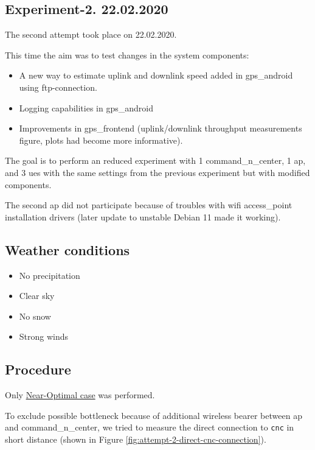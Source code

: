 \subsection{Experiment-2. 22.02.2020}\label{experiment-1.-22.02.2020}

The second attempt took place on 22.02.2020.

This time the aim was to test changes in the system components:

\begin{itemize}
\tightlist
\item
  A new way to estimate uplink and downlink speed added in \gls{gps_android} using \gls{ftp}-connection.
\item
  Logging capabilities in \gls{gps_android}
\item
  Improvements in \gls{gps_frontend} (uplink/downlink throughput measurements figure, plots had become more informative).
\end{itemize}



The goal is to perform an reduced experiment with 1 \gls{command_n_center}, 1 \gls{ap}, and 3 \glspl{ue} with the same settings from the previous experiment but with modified components.

The second \gls{ap} did not participate because of troubles with \gls{wifi} \gls{access_point} installation drivers (later update to unstable Debian 11 made it working).

\subsection{Weather conditions}

\begin{itemize}
\tightlist
\item
  No precipitation
\item
  Clear sky
\item
  No snow
\item
  Strong winds
\end{itemize}

\subsection{Procedure}

Only \hyperref[near-optimal-layout]{Near-Optimal case} was performed.

To exclude possible bottleneck because of additional wireless bearer between \gls{ap} and \gls{command_n_center}, we tried to measure the direct connection to \texttt{cnc} in short distance (shown in Figure \ref{fig:attempt-2-direct-cnc-connection}).

